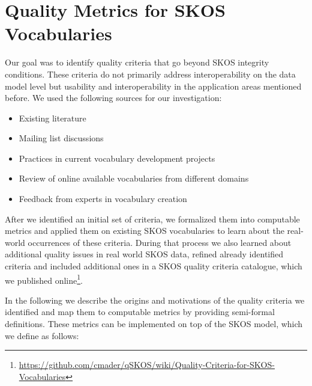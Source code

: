 
\section{Quality Metrics for SKOS Vocabularies}\label{sec:metrics}


Our goal was to identify quality criteria that go beyond SKOS integrity conditions. These criteria do not primarily address interoperability on the data model level but usability and interoperability in the application areas mentioned before. We used the following sources for our investigation:

\begin{itemize}
    \item Existing literature
    \item Mailing list discussions
		\item Practices in current vocabulary development projects
		\item Review of online available vocabularies from different domains
    \item Feedback from experts in vocabulary creation
\end{itemize}

After we identified an initial set of criteria, we formalized them into computable metrics and applied them on existing SKOS vocabularies to learn about the real-world occurrences of these criteria. During that process we also learned about additional quality issues in real world SKOS data, refined already identified criteria and included additional ones in a SKOS quality criteria catalogue, which we published online\footnote{\url{https://github.com/cmader/qSKOS/wiki/Quality-Criteria-for-SKOS-Vocabularies}}.


In the following we describe the origins and motivations of the quality criteria we identified and map them to computable metrics by providing semi-formal definitions. These metrics can be implemented on top of the SKOS model, which we define as follows:


